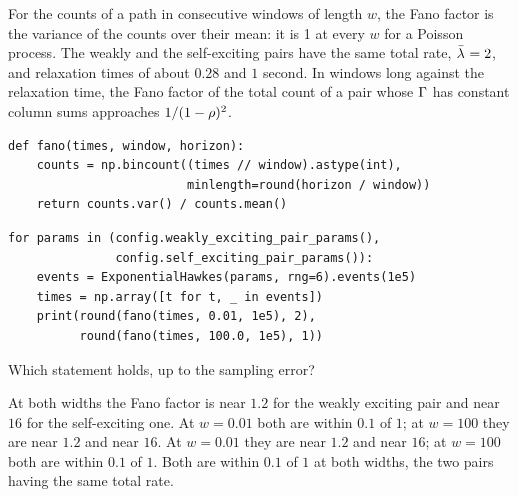 \begin{question}
\label{question.fanoFactorInShortAndLongWindows}
For the counts of a path in consecutive windows of length $w$,
the Fano factor is the variance of the counts over their mean:
it is 1 at every $w$ for a Poisson process.
The weakly and the self-exciting pairs have the same total rate, $\bar{\lambda_{ }} = 2$,
and relaxation times of about $0.28$ and $1$ second.
In windows long against the relaxation time,
the Fano factor of the total count of a pair whose $\Gamma$ has constant column sums
approaches $1/(1 - \rho)^{2}$.
\begin{lstlisting}[caption={The Fano factor of the counts in windows of length \protect\codehl{window}}, label=listing.fanoFactorInShortAndLongWindowsFano]
def fano(times, window, horizon):
    counts = np.bincount((times // window).astype(int),
                         minlength=round(horizon / window))
    return counts.var() / counts.mean()
\end{lstlisting}
\begin{lstlisting}[caption={Windows of $0.01$ and of $100$ seconds on one path of each pair}, label=listing.fanoFactorInShortAndLongWindowsRun]
for params in (config.weakly_exciting_pair_params(),
               config.self_exciting_pair_params()):
    events = ExponentialHawkes(params, rng=6).events(1e5)
    times = np.array([t for t, _ in events])
    print(round(fano(times, 0.01, 1e5), 2),
          round(fano(times, 100.0, 1e5), 1))
\end{lstlisting}
Which statement holds, up to the sampling error?
\begin{choices}
 \choice At both widths the Fano factor is near $1.2$ for the weakly exciting pair
  and near $16$ for the self-exciting one.
 \correctchoice At $w = 0.01$ both are within $0.1$ of $1$;
  at $w = 100$ they are near $1.2$ and near $16$.
 \choice At $w = 0.01$ they are near $1.2$ and near $16$;
  at $w = 100$ both are within $0.1$ of $1$.
 \choice Both are within $0.1$ of $1$ at both widths, the two pairs having the same total rate.
\end{choices}
\end{question}

